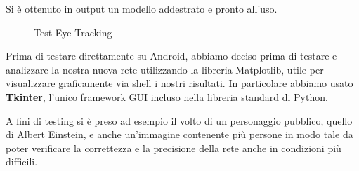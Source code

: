 Si è ottenuto in output un modello addestrato e pronto all’uso.

\begin{figure}[htbp]
    \centering
    \hspace{5mm}
    \caption{Test Eye-Tracking}
    \label{fig:testeyetracking}
\end{figure}

Prima di testare direttamente su Android, abbiamo deciso prima di testare e analizzare la nostra nuova rete utilizzando la libreria Matplotlib, utile per visualizzare graficamente via shell i nostri risultati. In particolare abbiamo usato \textbf{Tkinter}, l'unico framework GUI incluso nella libreria standard di Python.

A fini di testing si è preso ad esempio il volto di un
personaggio pubblico, quello di Albert Einstein, e anche un'immagine contenente più persone in modo tale da poter verificare la correttezza e la precisione della rete anche in condizioni più difficili.
